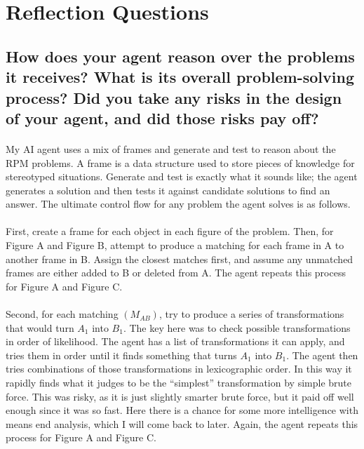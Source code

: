 \documentclass[12pt]{article}
\begin{document}
\label{sec:reflection_q}
\section{Reflection Questions}
\subsection{How does your agent reason over the problems it receives? What is its overall problem-solving process? Did you take any risks in the design of your agent, and did those risks pay off?}
\paragraph{}
My AI agent uses a mix of frames and generate and test to reason about the RPM problems. A frame is a data structure used to store pieces of knowledge for stereotyped situations. \cite{minsky} Generate and test is exactly what it sounds like; the agent generates a solution and then tests it against candidate solutions to find an answer. The ultimate control flow for any problem the agent solves is as follows. 
\paragraph{}
First, create a frame for each object in each figure of the problem. Then, for Figure A and Figure B, attempt to produce a matching for each frame in A to another frame in B. Assign the closest matches first, and assume any unmatched frames are either added to B or deleted from A. The agent repeats this process for Figure A and Figure C.
\paragraph{}
Second, for each matching $(M_{AB})$, try to produce a series of transformations that would turn $A_1$ into $B_1$. The key here was to check possible transformations in order of likelihood. The agent has a list of transformations it can apply, and tries them in order until it finds something that turns $A_1$ into $B_1$. The agent then tries combinations of those transformations in lexicographic order. In this way it rapidly finds what it judges to be the ``simplest'' transformation by simple brute force. This was risky, as it is just slightly smarter brute force, but it paid off well enough since it was so fast. Here there is a chance for some more intelligence with means end analysis, which I will come back to later. Again, the agent repeats this process for Figure A and Figure C.
\end{document}
